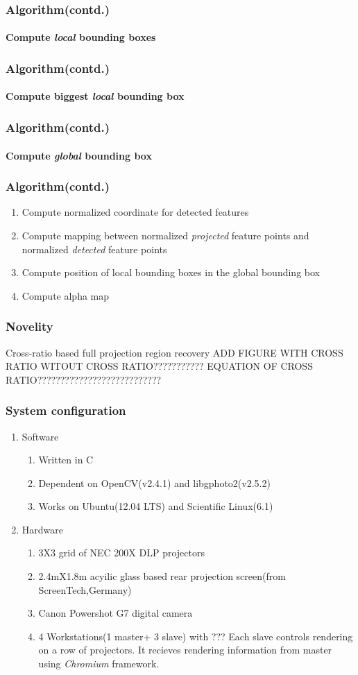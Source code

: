 \documentclass{beamer}
\begin{document}
\begin{frame}
\frametitle{Algorithm(contd.)}
\framesubtitle{Compute \textit{local} bounding boxes}
\end{frame}

\begin{frame}
\frametitle{Algorithm(contd.)}
\framesubtitle{Compute biggest \textit{local} bounding box}
\end{frame}


\begin{frame}
\frametitle{Algorithm(contd.)}
\framesubtitle{Compute \textit{global} bounding box}
\end{frame}

\begin{frame}
\frametitle{Algorithm(contd.)}
\begin{enumerate}
\item Compute normalized coordinate for detected features
\item Compute mapping between normalized \textit{projected} feature points and normalized \textit{detected} feature points
\item Compute position of local bounding boxes in the global bounding box
\item Compute alpha map
\end{enumerate}
\end{frame}

\begin{frame}
\frametitle{Novelity}
Cross-ratio based full projection region recovery
ADD FIGURE WITH CROSS RATIO WITOUT CROSS RATIO???????????
EQUATION OF CROSS RATIO???????????????????????????
\end{frame}

\begin{frame}
\frametitle{System configuration}
\begin{enumerate}
\item Software
\begin{enumerate}
\item Written in C
\item Dependent on OpenCV(v2.4.1) and libgphoto2(v2.5.2)
\item Works on Ubuntu(12.04 LTS) and Scientific Linux(6.1)
\end{enumerate}      
\item Hardware
\begin{enumerate}
\item 3X3 grid of NEC 200X DLP projectors
\item 2.4mX1.8m acyilic glass based rear projection screen(from ScreenTech,Germany)
\item Canon Powershot G7 digital camera
\item 4 Workstations(1 master+ 3 slave) with ???\newline
Each slave controls rendering on a row of projectors. It recieves rendering information from master using \textit{Chromium} framework.
\end{enumerate}
\end{enumerate}
\end{frame}
\end{document}

